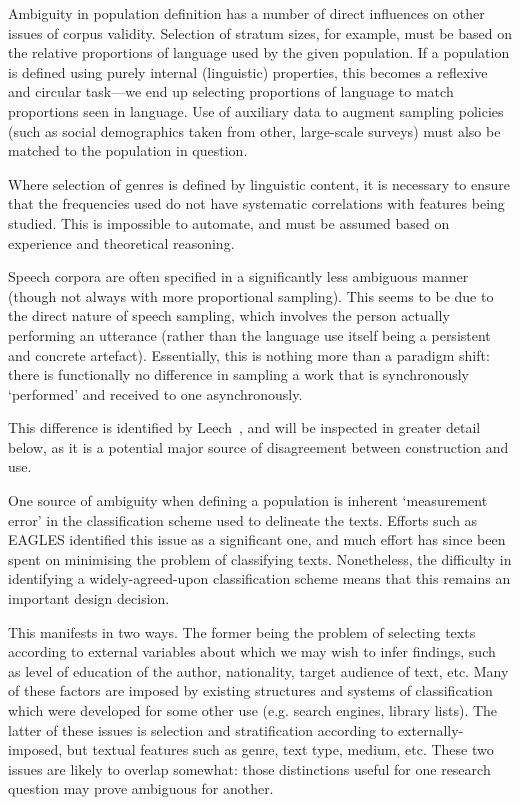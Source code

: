 Ambiguity in population definition has a number of direct influences on other issues of corpus validity. Selection of stratum sizes, for example, must be based on the relative proportions of language used by the given population.  If a population is defined using purely internal (linguistic) properties, this becomes a reflexive and circular task---we end up selecting proportions of language to match proportions seen in language.  Use of auxiliary data to augment sampling policies (such as social demographics taken from other, large-scale surveys) must also be matched to the population in question.

Where selection of genres is defined by linguistic content, it is necessary to ensure that the frequencies used do not have systematic correlations with features being studied.  This is impossible to automate, and must be assumed based on experience and theoretical reasoning.


Speech corpora are often specified in a significantly less ambiguous manner (though not always with more proportional sampling). This seems to be due to the direct nature of speech sampling, which involves the person actually performing an utterance (rather than the language use itself being a persistent and concrete artefact).  Essentially, this is nothing more than a paradigm shift: there is functionally no difference in sampling a work that is synchronously `performed' and received to one asynchronously.

This difference is identified by Leech~\cite{leech2006new}, and will be inspected in greater detail below, as it is a potential major source of disagreement between construction and use. %



One source of ambiguity when defining a population is inherent `measurement error' in the classification scheme used to delineate the texts.
Efforts such as EAGLES\cite{EagTcwgCtypeaglespreliminary} identified this issue as a significant one, and much effort has since been spent on minimising the problem of classifying texts.  Nonetheless, the difficulty in identifying a widely-agreed-upon classification scheme means that this remains an important design decision.

This manifests in two ways. The former being the problem of selecting texts according to external variables about which we may wish to infer findings, such as level of education of the author, nationality, target audience of text, etc.  Many of these factors are imposed by existing structures and systems of classification which were developed for some other use (e.g. search engines, library lists).  The latter of these issues is selection and stratification according to externally-imposed, but textual features such as genre, text type, medium, etc.  These two issues are likely to overlap somewhat: those distinctions useful for one research question may prove ambiguous for another.

